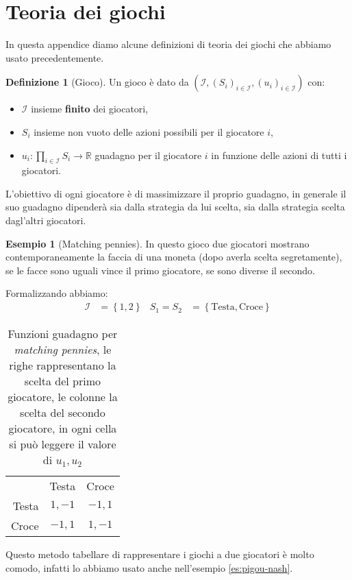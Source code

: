 \documentclass[a4paper]{article}
\theoremstyle{plain}
\theoremstyle{definition}
\newtheorem{mydef}[myteo]{Definizione}
\newtheorem{myes}[myteo]{Esempio}
\theoremstyle{remark}
\newcommand{\set}[1]{\left\{#1\right\}}
\newcommand{\pa}[1]{\left(#1\right)}
\begin{document}
\appendix

\section{Teoria dei giochi}
\label{sec:teoria-giochi}

In questa appendice diamo alcune definizioni di teoria dei giochi che
abbiamo usato precedentemente.

\begin{mydef}[Gioco]%
  Un gioco è dato da $\pa{\mathcal{I},\pa{S_i}_{i\in\mathcal{I}},
    \pa{u_i}_{i\in\mathcal{I}}}$ con:
  \begin{itemize}
  \item $\mathcal{I}$ insieme \textbf{finito} dei giocatori,
  \item $S_i$ insieme non vuoto delle azioni possibili per il
    giocatore $i$,
  \item $u_i: \prod _{i\in\mathcal{I}} S_i \to \mathbb{R}$ guadagno
    per il giocatore $i$ in funzione delle azioni di tutti i
    giocatori.
  \end{itemize}
\end{mydef}

L'obiettivo di ogni giocatore è di massimizzare il proprio guadagno,
in generale il suo guadagno dipenderà sia dalla strategia da lui
scelta, sia dalla strategia scelta dagl'altri giocatori.

\begin{myes}[Matching pennies]
\label{es:matching-pennies}
  In questo gioco due giocatori mostrano contemporaneamente la faccia
  di una moneta (dopo averla scelta segretamente), se le facce sono
  uguali vince il primo giocatore, se sono diverse il secondo.
  
  Formalizzando abbiamo:
  \begin{align*}
    \mathcal{I} &= \set{1,2} &
                               S_1 = S_2 &= \set{\text{Testa},\text{Croce}}
  \end{align*}
  \begin{table}[!ht]
    \centering
    \begin{tabular}{rcc}
      & Testa & Croce \\
      \cline{2-3}
      Testa & \multicolumn{1}{|c|}{$1,-1$} & \multicolumn{1}{|c|}{$-1,1$}  \\
      \cline{2-3}
      Croce & \multicolumn{1}{|c|}{$-1,1$} & \multicolumn{1}{|c|}{$1,-1$}  \\
      \cline{2-3}
    \end{tabular}
    
    \caption{Funzioni guadagno per \textit{matching pennies}, le righe
      rappresentano la scelta del primo giocatore, le colonne la scelta
      del secondo giocatore, in ogni cella si può leggere il valore di
      $u_1,u_2$}
    \label{tab:u1u2-matching-pennies}
  \end{table}

  Questo metodo tabellare di rappresentare i giochi a due giocatori è
  molto comodo, infatti lo abbiamo usato anche nell'esempio
  \ref{es:pigou-nash}.
\end{myes}
\end{document}
